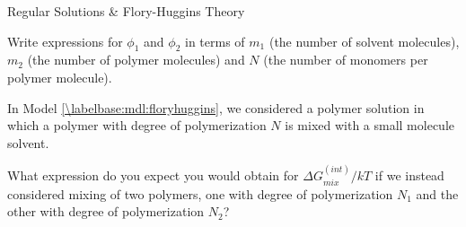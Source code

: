 \begin{activity}{Regular Solutions \& Flory-Huggins Theory}
\begin{exercises}
		Write expressions for $\phi_1$ and $\phi_2$ in terms of $m_1$ (the number of solvent molecules), $m_2$ (the number of polymer molecules) and $N$ (the number of monomers per polymer molecule).
				
					\begin{solution}\end{solution}
			
		\exercise In Model \ref{\labelbase:mdl:floryhuggins}, we considered a polymer solution in which a polymer with degree of polymerization $N$ is mixed with a small molecule solvent.
		
			What expression do you expect you would obtain for $\Delta G_{mix}^{(int)}/kT$ if we instead considered mixing of two polymers, one with degree of polymerization $N_1$ and the other with degree of polymerization $N_2$?
				
					\begin{solution}\end{solution}
					
\end{exercises}
	
\end{activity}